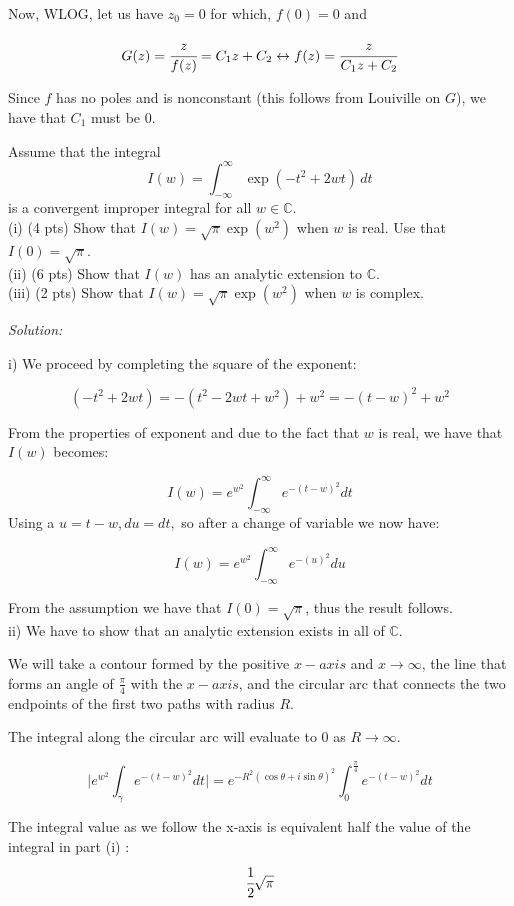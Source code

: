 \documentclass[addpoints,12pt]{exam}
\newcommand{\C}{{\mathbb C}}
\newcommand{\abs}[1]{\lvert {#1} \rvert }
\begin{document}
\begin{questions}
Now, WLOG, let us have $z_0=0$ for which, $f(0)=0$ and 

$$G(z)= \cfrac{z}{f(z)} = C_1z+ C_2 \leftrightarrow f(z)=\cfrac{z}{C_1z+C_2}$$

Since $f$ has no poles and is nonconstant (this follows from Louiville on $G$), we have that $C_1$ must be $0$.


\newpage


\question[12]  Assume that the integral 
\[ I(w) =\int_{-\infty}^{\infty} \exp{(-t^2+2wt)}\, dt \]
is a convergent improper integral for all $w\in\C$.\bigskip\\
(i)  (4 pts)  Show that $I(w) = \sqrt{\pi}\exp{(w^2)}$ when $w$ is real.   Use that $I(0)= \sqrt{\pi}$.\bigskip\\
(ii)   (6 pts) Show that $I(w)$ has an analytic extension to $\C$.\bigskip\\
(iii)   (2 pts) Show that $I(w) = \sqrt{\pi}\exp{(w^2)}$ when $w$ is complex.

\emph{Solution:}

i) We proceed by completing the square of the exponent:

$$(-t^2+2wt)=-(t^2-2wt+ w^2)+w^2=-(t-w)^2+w^2$$

From the properties of exponent and due to the fact that $w$ is real, we have that $I(w)$ becomes:

$$I(w) = e^{w^2}\int_{-\infty}^{\infty} e^{-(t-w)^2} dt$$
Using a $u=t-w, du=dt,$ so after a change of variable we now have:

$$I(w) = e^{w^2}\int_{-\infty}^{\infty} e^{-(u)^2} du$$

From the assumption we have that $I(0)=\sqrt{\pi}$, thus the result follows. \\

ii) We have to show that an analytic extension exists in all of $\C$.

We will take a contour formed by the positive $x-axis$ and $x\to \infty$, the line that forms an angle of $\frac{\pi}{4}$ with the $x-axis$, and the circular arc that connects  the two endpoints of the first two paths with radius $R$.  

The integral along the circular arc will evaluate to $0$ as $R \to \infty$.

$$ \abs{e^{w^2}\int_\gamma e^{-(t-w)^2} dt} =  e^{-R^2(\cos \theta +i\sin \theta)^2}\int_{0}^{\tfrac{\pi}{4}} e^{-(t-w)^2} dt $$

The integral value as we follow the x-axis is equivalent half the value of the integral in part (i) : $$\cfrac{1}{2}\sqrt{\pi}$$


\end{questions}
\end{document}
